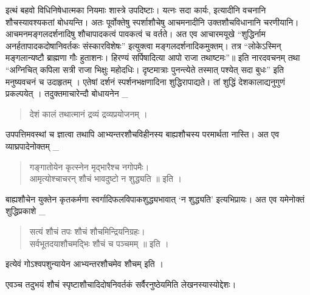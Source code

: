 इत्थं बहवो विधिनिषेधात्मका नियमाः शास्त्रे उपदिष्टाः। यत्नः सदा कार्यः, इत्यादीनि वचनानि शौचस्यावश्यकतां बोधयन्ति। अतः पूर्वोक्तेषु स्पर्शाशौचेषु आचमनादीनि उक्तशौचविधानानि चरणीयानि। आचमनमङ्गलदर्शनादिषु शौचापादकत्वं पावकत्वं च वर्तते। अत एव आचारमयूखे “शुद्धिर्नाम अनर्हतापादकदोषानिवर्तकः संस्कारविशेषः” इत्युक्त्वा मङ्गलदर्शनादिकमुक्तम्। तत्र “लोकेऽस्मिन् मङ्गलान्यष्टौ ब्राह्मणा गौः हुताशनः। हिरण्यं सर्पिषादित्या आपो राजा तथाष्टमः”॥ इति नारदवचनम् तथा “अग्निचित् कपिला सत्री राजा भिक्षुः महोदधिः। दृष्टमात्राः पुनन्त्येते तस्मात् पश्येत् सदा बुधः” इति मनुष्यवचनं च उदाहृतम् । एतेषां दर्शनं स्पर्शनभक्षणादिना शुद्धिरापाद्यते। तां शुद्धिं देशकालाद्यनुगुणं प्रकल्पयेत् । तदुक्तमाचारेन्दौ बोधायनेन _
\begin{verse}
देशं कालं तथात्मानं द्रव्यं द्रव्यप्रयोजनम् । 
\end{verse}
उपपत्तिमवस्थां च ज्ञात्वा तथापि आभ्यन्तरशौचविहीनस्य बाह्यशौचस्य परमार्थता नास्ति। अत एव व्याघ्रपादेनोक्तम् _
\begin{verse}
गङ्गातोयेन कृत्स्नेन मृद्भारैश्च नगोपमैः। \\
आमृत्योश्चाचरन् शौचं भावदुष्टो न शुद्ध्यति ॥ इति ।
\end{verse}
बाह्यशौचेन युक्तेन कृतकर्मणा स्वर्गादिफलविपाकशुद्ध्यभावात् ‘न शुद्ध्यति’ इत्यभिप्रायः। अत एव यमेनोक्तं शुद्धिप्रकाशे _
\begin{verse}
सत्यं शौचं तपः शौचं शौचमिन्द्रियनिग्रहः। \\
सर्वभूतदयाशौचमद्भिः शौचं च पञ्चमम् ॥ इति । 
\end{verse}
इत्येवं गोऽश्वपशुन्यायेन आभ्यन्तरशौचमेव शौचम् इति । 

एवञ्च तदुभयं शौचं स्पृष्टाशौचादिदोषनिवर्तकं सर्वैरनुष्ठेयमिति लेखनस्यास्योद्देशः।
